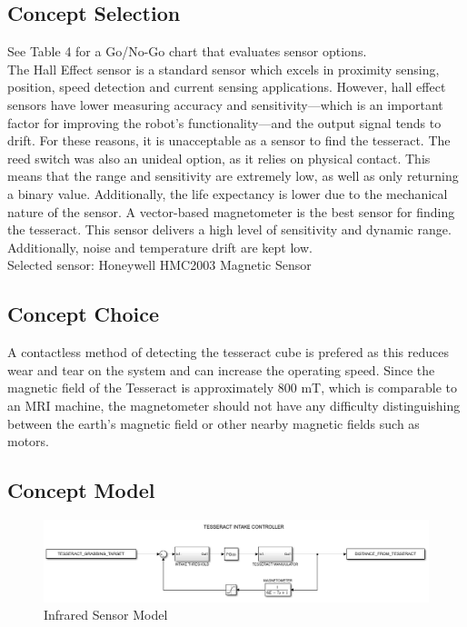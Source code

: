 \documentclass[12pt]{article}
\begin{document}
\subsection{Concept Selection}
See Table 4 for a Go/No-Go chart that evaluates sensor options.\\ 
The Hall Effect sensor is a standard sensor which excels in proximity sensing, position, speed detection and current sensing applications. However, hall effect sensors have lower measuring accuracy and sensitivity—which is an important factor for improving the robot’s functionality—and the output signal tends to drift. For these reasons, it is unacceptable as a sensor to find the tesseract.
The reed switch was also an unideal option, as it relies on physical contact. This means that the range and sensitivity are extremely low, as well as only returning a binary value. Additionally, the life expectancy is lower due to the mechanical nature of the sensor.
A vector-based magnetometer is the best sensor for finding the tesseract. This sensor delivers a high level of sensitivity and dynamic range. Additionally, noise and temperature drift are kept low. \\
Selected sensor: Honeywell HMC2003 Magnetic Sensor

\subsection{Concept Choice}
A contactless method of detecting the tesseract cube is prefered as this reduces wear and tear on the system and can increase the operating speed. Since the magnetic field of the Tesseract is approximately 800 mT, which is comparable to an MRI machine, the magnetometer should not have any difficulty distinguishing between the earth’s magnetic field or other nearby magnetic fields such as motors.

\subsection{Concept Model}\begin{figure}[htb!]
\begin{center}
\caption{Infrared Sensor Model}
\includegraphics[scale=0.6]{Figures/simulink_tesseract}
\end{center}
\end{figure}
\FloatBarrier
\end{document}
